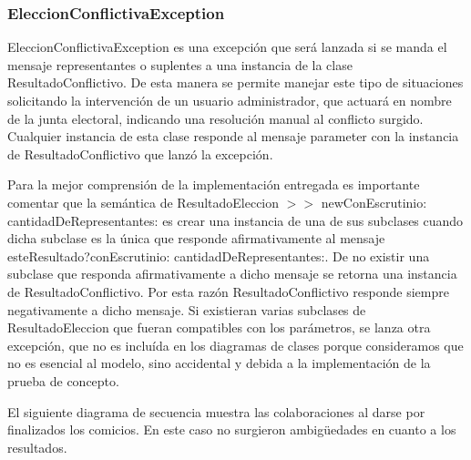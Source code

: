 \subsubsection{EleccionConflictivaException}
EleccionConflictivaException es una excepción que será lanzada si se manda el mensaje representantes o suplentes a una instancia de la clase ResultadoConflictivo. De esta manera se permite manejar este tipo de situaciones solicitando la intervención de un usuario administrador, que actuará en nombre de la junta electoral, indicando una resolución manual al conflicto surgido. Cualquier instancia de esta clase responde al mensaje parameter con la instancia de ResultadoConflictivo que lanzó la excepción.



Para la mejor comprensión de la implementación entregada es importante comentar que la semántica de ResultadoEleccion $>>$ newConEscrutinio: cantidadDeRepresentantes:  es crear una instancia de una de sus subclases cuando dicha subclase es la única que responde afirmativamente al mensaje esteResultado?conEscrutinio: cantidadDeRepresentantes:. De no existir una subclase que responda afirmativamente a dicho mensaje se retorna una instancia de ResultadoConflictivo. Por esta razón ResultadoConflictivo responde siempre negativamente a dicho mensaje. Si existieran varias subclases de ResultadoEleccion que fueran compatibles con los parámetros, se lanza otra excepción, que no es incluída en los diagramas de clases porque consideramos que no es esencial al modelo, sino accidental y debida a la implementación de la prueba de concepto.


\bigskip


El siguiente diagrama de secuencia muestra las colaboraciones al darse por finalizados los comicios. En este caso no surgieron ambigüedades en cuanto a los resultados. 


